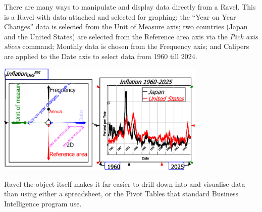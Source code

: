 There are many ways to manipulate and display data directly from a
Ravel. This is a Ravel with data attached and selected for graphing:
the ``Year on Year Changes'' data is selected from the Unit of Measure
axis; two countries (Japan and the United States) are selected from
the Reference area axis via the \emph{Pick axis slices} command; Monthly
data is chosen from the Frequency axis; and Calipers are applied to
the Date axis to select data from 1960 till 2024.

\includegraphics[width=10cm]{images/01BRavelDataInflationSelected}

Ravel the object itself makes it far easier to drill down into and
visualise data than using either a spreadsheet, or the Pivot Tables
that standard Business Intelligence program use.

